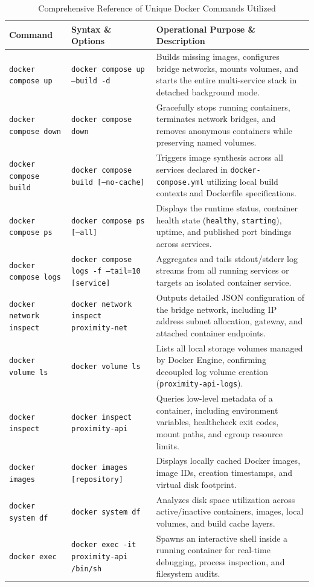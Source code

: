 \documentclass[11pt,a4paper]{article}
\begin{document}
\begin{table}[H]
\centering
\scriptsize
\caption{Comprehensive Reference of Unique Docker Commands Utilized}
\label{tab:docker_commands}
\begin{tabularx}{\textwidth}{@{}l p{4.8cm} p{8.4cm}@{}}
\toprule
\textbf{Command} & \textbf{Syntax \& Options} & \textbf{Operational Purpose \& Description} \\ \midrule
\texttt{docker compose up} & \texttt{docker compose up --build -d} & Builds missing images, configures bridge networks, mounts volumes, and starts the entire multi-service stack in detached background mode. \\
\texttt{docker compose down} & \texttt{docker compose down} & Gracefully stops running containers, terminates network bridges, and removes anonymous containers while preserving named volumes. \\
\texttt{docker compose build} & \texttt{docker compose build [--no-cache]} & Triggers image synthesis across all services declared in \texttt{docker-compose.yml} utilizing local build contexts and Dockerfile specifications. \\
\texttt{docker compose ps} & \texttt{docker compose ps [--all]} & Displays the runtime status, container health state (\texttt{healthy}, \texttt{starting}), uptime, and published port bindings across services. \\
\texttt{docker compose logs} & \texttt{docker compose logs -f --tail=10 [service]} & Aggregates and tails stdout/stderr log streams from all running services or targets an isolated container service. \\
\texttt{docker network inspect} & \texttt{docker network inspect proximity-net} & Outputs detailed JSON configuration of the bridge network, including IP address subnet allocation, gateway, and attached container endpoints. \\
\texttt{docker volume ls} & \texttt{docker volume ls} & Lists all local storage volumes managed by Docker Engine, confirming decoupled log volume creation (\texttt{proximity-api-logs}). \\
\texttt{docker inspect} & \texttt{docker inspect proximity-api} & Queries low-level metadata of a container, including environment variables, healthcheck exit codes, mount paths, and cgroup resource limits. \\
\texttt{docker images} & \texttt{docker images [repository]} & Displays locally cached Docker images, image IDs, creation timestamps, and virtual disk footprint. \\
\texttt{docker system df} & \texttt{docker system df} & Analyzes disk space utilization across active/inactive containers, images, local volumes, and build cache layers. \\
\texttt{docker exec} & \texttt{docker exec -it proximity-api /bin/sh} & Spawns an interactive shell inside a running container for real-time debugging, process inspection, and filesystem audits. \\ \bottomrule
\end{tabularx}
\end{table}
\end{document}
